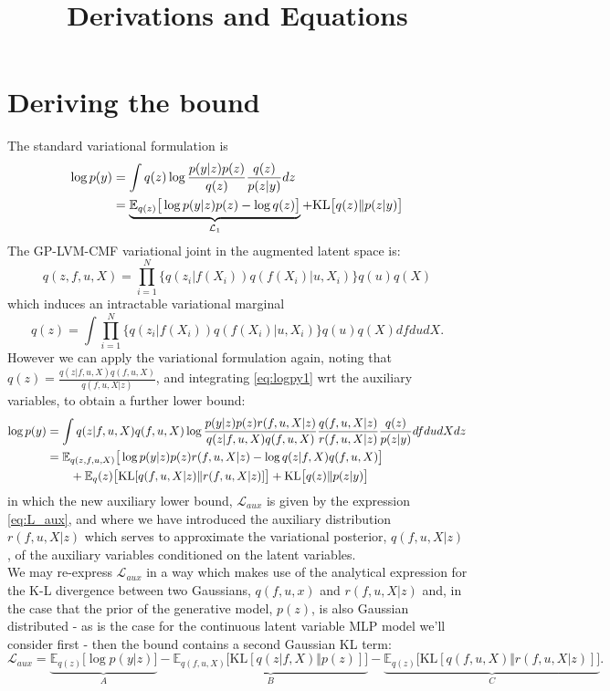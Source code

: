 \documentclass[12pt]{article}
\title{\textbf{Derivations and Equations}}
\date{}
\begin{document}
\maketitle


\section{Deriving the bound} %
\label{sec:derive_bound}
The standard variational formulation is
%
\begin{align}
    \log p(y) &= \int q(z)\log\frac{p(y|z)p(z)}{q(z)}\frac{q(z)}{p(z|y)} dz\notag\\
    &= \underbrace{\mathbb{E}_{q(z)}\big[ \log p(y|z)p(z) - \log q(z) \big]}_{\mathcal{L}_1} + \text{KL}\big[ q(z)\Vert p(z|y) \big]\label{eq:logpy1}
\end{align}
%
The GP-LVM-CMF variational joint in the augmented latent space is:
%
\begin{equation}
    q(z,f,u,X) = \prod_{i=1}^N \{q(z_i|f(X_i))q(f(X_i)|u, X_i)\}q(u)q(X)
\end{equation}
%
which induces an intractable variational marginal
%
\begin{equation}
    q(z) = \int \prod_{i=1}^N \{q(z_i|f(X_i))q(f(X_i)|u, X_i)\}q(u)q(X) df du dX.
\end{equation}
%
However we can apply the variational formulation again, noting that $q(z) = \frac{q(z|f,u,X)q(f,u,X)}{q(f,u,X|z)}$, and integrating \ref{eq:logpy1} wrt the auxiliary variables, to obtain a further lower bound:
\begin{align}
    \log p(y) &= \int q(z|f,u,X)q(f,u,X)\log \frac{p(y|z)p(z)r(f,u,X|z)}{q(z|f,u,X)q(f,u,X)}\frac{q(f,u,X|z)}{r(f,u,X|z)}\frac{q(z)}{p(z|y)} df du dX dz\notag\\
    &= \mathbb{E}_{q(z,f,u,X)}\big[ \log p(y|z)p(z)r(f,u,X|z) - \log q(z|f,X)q(f,u,X) \big]\label{eq:L_aux}\\
    &\qquad+ \mathbb{E}_q(z)\big[ \text{KL}[q(f,u,X|z)\Vert r(f,u,X|z)] \big] + \text{KL}\big[ q(z)\Vert p(z|y) \big]
\end{align}
%
in which the new auxiliary lower bound, $\mathcal{L}_{aux}$ is given by the expression \ref{eq:L_aux}, and where we have introduced the auxiliary distribution $r(f,u,X|z)$ which serves to approximate the variational posterior, $q(f,u,X|z)$, of the auxiliary variables conditioned on the latent variables.\\
We may re-express $\mathcal{L}_{aux}$ in a way which makes use of the analytical expression for the K-L divergence between two Gaussians, $q(f,u,x)$ and $r(f,u,X|z)$ and, in the case that the prior of the generative model, $p(z)$, is also Gaussian distributed - as is the case for the continuous latent variable MLP model we'll consider first - then the bound contains a second Gaussian KL term:
%
\begin{equation}
    \mathcal{L}_{aux} = \underbrace{\mathbb{E}_{q(z)}\big[ \log p(y|z) \big]}_{A} - \underbrace{\mathbb{E}_{q(f,u,X)}\big[ \text{KL}[q(z|f,X)\Vert p(z)] \big]}_{B} - \underbrace{\mathbb{E}_{q(z)}\big[ \text{KL}[q(f,u,X)\Vert r(f,u,X|z)] \big]}_{C}.\label{eq:L_aux_ABC}
\end{equation}
%
%
\end{document}
